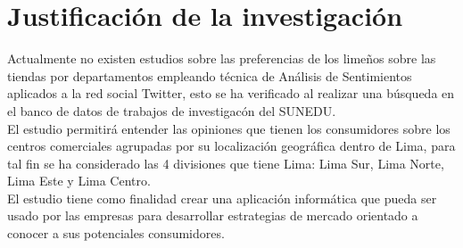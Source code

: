 
\chapter{Justificación de la investigaci\'on}

Actualmente no existen estudios sobre las preferencias  de los lime\~nos sobre las tiendas por departamentos empleando técnica de Análisis de Sentimientos aplicados a la red social Twitter, esto se ha verificado al realizar una b\'usqueda en el banco de datos de trabajos de investigac\'on del SUNEDU. \\

El estudio permitirá entender las opiniones que tienen los consumidores sobre los centros 
comerciales agrupadas por su 
localización geográfica dentro de Lima, para tal fin se ha considerado las 4 divisiones 
que tiene Lima:  Lima Sur, Lima Norte, Lima Este y Lima Centro. \\

El estudio tiene como finalidad crear una aplicación informática que pueda ser usado 
por las empresas para desarrollar estrategias de mercado orientado a conocer a sus 
potenciales consumidores.

\cleardoublepage